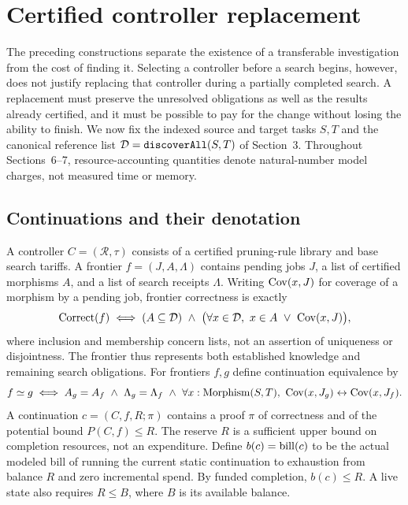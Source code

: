 \section{Certified controller replacement}\label{sec:replacement}
The preceding constructions separate the existence of a transferable investigation from the cost of finding it. Selecting a controller before a search begins, however, does not justify replacing that controller during a partially completed search. A replacement must preserve the unresolved obligations as well as the results already certified, and it must be possible to pay for the change without losing the ability to finish. We now fix the indexed source and target tasks $S,T$ and the canonical reference list $\mathcal D=\texttt{discoverAll}(S,T)$ of Section~3. Throughout Sections~6--7, resource-accounting quantities denote natural-number model charges, not measured time or memory.

\subsection{Continuations and their denotation}
A controller $C=(\mathcal R,\tau)$ consists of a certified pruning-rule library and base search tariffs. A frontier $f=(J,A,\Lambda)$ contains pending jobs $J$, a list of certified morphisms $A$, and a list of search receipts $\Lambda$. Writing $\operatorname{Cov}(x,J)$ for coverage of a morphism by a pending job, frontier correctness is exactly
\begin{equation}\label{eq:frontier-correct}
 \operatorname{Correct}(f)\;\Longleftrightarrow\;
 (A\subseteq\mathcal D)\ \land\
 \bigl(\forall x\in\mathcal D,\ x\in A\ \lor\ \operatorname{Cov}(x,J)\bigr),
\end{equation}
where inclusion and membership concern lists, not an assertion of uniqueness or disjointness. The frontier thus represents both established knowledge and remaining search obligations. For frontiers $f,g$ define continuation equivalence by
\begin{equation}\label{eq:same-cont}
 f\simeq g\;\Longleftrightarrow\;
 A_g=A_f\ \land\ \Lambda_g=\Lambda_f\ \land\
 \forall x:\mathrm{Morphism}(S,T),\ \Cov(x,J_g)\leftrightarrow\Cov(x,J_f).
\end{equation}
A continuation $c=(C,f,R;\pi)$ contains a proof $\pi$ of correctness and of the potential bound $P(C,f)\le R$. The reserve $R$ is a sufficient upper bound on completion resources, not an expenditure. Define $b(c)=\operatorname{bill}(c)$ to be the actual modeled bill of running the current static continuation to exhaustion from balance $R$ and zero incremental spend. By funded completion, $b(c)\le R$. A live state also requires $R\le B$, where $B$ is its available balance.

